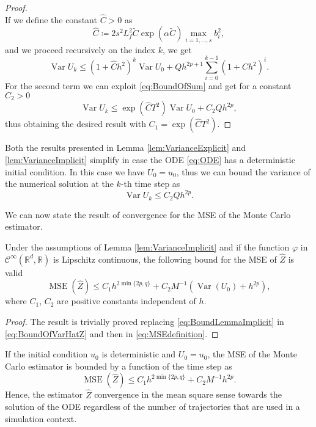 \documentclass{siamart1116}
\numberwithin{theorem}{section}
\renewcommand{\phi}{\varphi}
\newcommand{\R}{\mathbb{R}}
\newcommand{\defeq}{\coloneqq}
\newcommand{\Var}{\operatorname{Var}}
\newcommand{\MSE}{\operatorname{MSE}}
\newcommand{\sksum}{\textstyle\sum}
\begin{document}
\begin{proof}
\begin{equation}
	\end{equation}
	If we define the constant $\hat C > 0$ as 
	\begin{equation}
		\hat C \defeq 2 s^2 L_f^2 \tilde C  \exp(\alpha \tilde C)\max_{i=1,\ldots,s} b_i^2,
	\end{equation}
	and we proceed recursively on the index $k$, we get
	\begin{equation}
		\Var U_k \leq (1 + \hat C h^2)^k \Var U_0 + Qh^{2p+1}\sksum_{i=0}^{k-1} (1 + \hat C h^2)^i.
	\end{equation}
	For the second term we can exploit \eqref{eq:BoundOfSum} and get for a constant $C_2 > 0$
	\begin{equation}
		\Var U_k \leq \exp(\hat C T^2) \Var U_0 + C_2 Q h^{2p},
	\end{equation}
	thus obtaining the desired result with $C_1 = \exp(\hat C T^2)$.
\end{proof}

\begin{remark} Both the results presented in Lemma \ref{lem:VarianceExplicit} and \ref{lem:VarianceImplicit} simplify in case the ODE \eqref{eq:ODE} has a deterministic initial condition. In this case we have $U_0 = u_0$, thus we can bound the variance of the numerical solution at the $k$-th time step as
\begin{equation}
	\Var U_k \leq C_2 Q h^{2p}.
\end{equation} 
\end{remark} 

We can now state the result of convergence for the MSE of the Monte Carlo estimator.

\begin{theorem}\label{thm:MSE} Under the assumptions of Lemma \ref{lem:VarianceImplicit} and if the function $\phi$ in $\mathcal C^\infty(\R^d, \R)$ is Lipschitz continuous, the following bound for the MSE of $\hat Z$ is valid
	\begin{equation}
		\MSE(\hat Z) \leq C_1 h^{2\min\{2p, q\}} + C_2 M^{-1} (\Var(U_0) + h^{2p}),
	\end{equation}	
	where $C_1$, $C_2$ are positive constants independent of $h$.	
\end{theorem}

\begin{proof}
	The result is trivially proved replacing \eqref{eq:BoundLemmaImplicit} in \eqref{eq:BoundOfVarHatZ} and then in \eqref{eq:MSEdefinition}.
\end{proof}

\begin{remark} If the initial condition $u_0$ is deterministic and $U_0 = u_0$, the MSE of the Monte Carlo estimator is bounded by a function of the time step as
	\begin{equation}
		\MSE(\hat Z) \leq C_1 h^{2\min\{2p, q\}} + C_2 M^{-1} h^{2p}.
	\end{equation}
	Hence, the estimator $\hat Z$ convergence in the mean square sense towards the solution of the ODE regardless of the number of trajectories that are used in a simulation context.
\end{remark}
\end{document}
